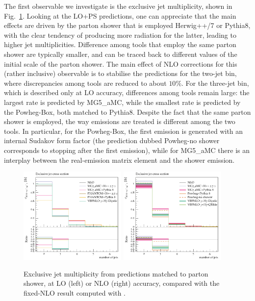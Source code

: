 The first observable we investigate is the exclusive jet multiplicity, shown in Fig.~\ref{fig:PSnjet}. Looking at the LO+PS predictions, one can appreciate that the
main effects are driven by the parton shower that is employed {\sc Herwig++/7} or {\sc Pythia8}, with the clear tendency of producing more radiation for the latter,
leading to higher jet multiplicities. Difference among tools that employ the same parton shower are typically smaller, and can be traced back to different values of the
initial scale of the parton shower. The main effect of NLO corrections for this (rather inclusive) observable is to stabilise the predictions for the two-jet bin, where discrepancies
among tools are reduced to about $10\%$. For the three-jet bin, which is described only at LO accuracy, differences among tools remain large: the largest rate is predicted by
{\sc MG5\_aMC}, while the smallest rate is predicted by the {\sc Powheg-Box}, both matched to {\sc Pythia8}. Despite the fact that the same parton shower is employed, the way emissions are treated
is different among the two tools. In particular, for the {\sc Powheg-Box}, the first emission is generated with an internal Sudakov form factor (the
prediction dubbed {\sc Powheg-no shower} corresponds to stopping after the first emission), while for {\sc MG5\_aMC} there is an
interplay between the real-emission matrix element and the shower emission.

\begin{figure}[hbt]
\centering
\includegraphics[width=0.47\textwidth]{figures/LOPS/jetsexclusive.pdf}
\includegraphics[width=0.47\textwidth]{figures/NLOPS/jetsexclusive.pdf}
\caption{Exclusive jet multiplicity from predictions matched to parton shower, at LO (left) or NLO (right) accuracy, compared with the fixed-NLO result
    computed with . }
\label{fig:PSnjet}
\end{figure}
 
